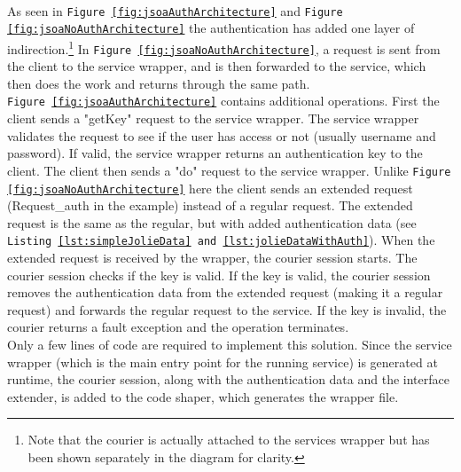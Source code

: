 \documentclass[12pt,a4paper]{article}
\begin{document}
~\\
As seen in \texttt{Figure \ref{fig:jsoaAuthArchitecture}} and \texttt{Figure \ref{fig:jsoaNoAuthArchitecture}} the authentication has added one layer of indirection.\footnote{Note that the courier is actually attached to the services wrapper but has been shown separately in the diagram for clarity.} In \texttt{Figure \ref{fig:jsoaNoAuthArchitecture}}, a request is sent from the client to the service wrapper, and is then forwarded to the service, which then does the work and returns through the same path. \\
\texttt{Figure \ref{fig:jsoaAuthArchitecture}} contains additional operations. First the client sends a "getKey" request to the service wrapper. The service wrapper validates the request to see if the user has access or not (usually username and password). If valid, the service wrapper returns an authentication key to the client. The client then sends a "do" request to the service wrapper. Unlike \texttt{Figure \ref{fig:jsoaNoAuthArchitecture}} here the client sends an extended request (Request\_auth in the example) instead of a regular request. The extended request is the same as the regular, but with added authentication data (see \texttt{Listing \ref{lst:simpleJolieData} and \ref{lst:jolieDataWithAuth}}). When the extended request is received by the wrapper, the courier session starts. The courier session checks if the key is valid. If the key is valid, the courier session removes the authentication data from the extended request (making it a regular request) and forwards the regular request to the service. If the key is invalid, the courier returns a fault exception and the operation terminates. \\

Only a few lines of code are required to implement this solution. Since the service wrapper (which is the main entry point for the running service) is generated at runtime, the courier session, along with the authentication data and the interface extender, is added to the code shaper, which generates the wrapper file.
\end{document}
